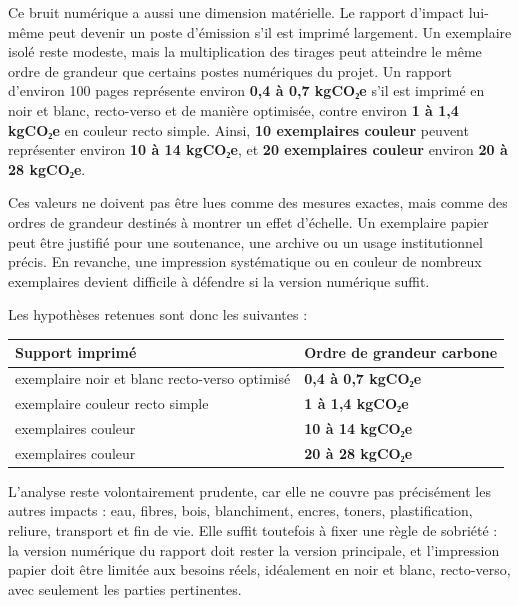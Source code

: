 \documentclass[
  10pt,
  a4paper,
  DIV=11,
  numbers=noendperiod,
  oneside]{scrreprt}
\newcounter{none} %
\let\oldtextbf\textbf
\renewcommand{\textbf}[1]{\oldtextbf{\textcolor{cmmnavy}{#1}}}
\begin{document}
Ce bruit numérique a aussi une dimension matérielle. Le rapport d'impact
lui-même peut devenir un poste d'émission s'il est imprimé largement. Un
exemplaire isolé reste modeste, mais la multiplication des tirages peut
atteindre le même ordre de grandeur que certains postes numériques du
projet. Un rapport d'environ 100 pages représente environ \textbf{0,4 à
0,7 kgCO₂e} s'il est imprimé en noir et blanc, recto-verso et de manière
optimisée, contre environ \textbf{1 à 1,4 kgCO₂e} en couleur recto
simple. Ainsi, \textbf{10 exemplaires couleur} peuvent représenter
environ \textbf{10 à 14 kgCO₂e}, et \textbf{20 exemplaires couleur}
environ \textbf{20 à 28 kgCO₂e}.

Ces valeurs ne doivent pas être lues comme des mesures exactes, mais
comme des ordres de grandeur destinés à montrer un effet d'échelle. Un
exemplaire papier peut être justifié pour une soutenance, une archive ou
un usage institutionnel précis. En revanche, une impression systématique
ou en couleur de nombreux exemplaires devient difficile à défendre si la
version numérique suffit.

Les hypothèses retenues sont donc les suivantes :

{\def\LTcaptype{none} %
\begin{longtable}[]{@{}
  >{\raggedright\arraybackslash}p{}
  >{\raggedleft\arraybackslash}p{}@{}}
\toprule\noalign{}
\begin{minipage}[b]{\linewidth}\raggedright
Support imprimé
\end{minipage} & \begin{minipage}[b]{\linewidth}\raggedleft
Ordre de grandeur carbone
\end{minipage} \\
\midrule\noalign{}
\endhead
\bottomrule\noalign{}
\endlastfoot
1 exemplaire noir et blanc recto-verso optimisé & \textbf{0,4 à 0,7
kgCO₂e} \\
1 exemplaire couleur recto simple & \textbf{1 à 1,4 kgCO₂e} \\
10 exemplaires couleur & \textbf{10 à 14 kgCO₂e} \\
20 exemplaires couleur & \textbf{20 à 28 kgCO₂e} \\
\end{longtable}
}

L'analyse reste volontairement prudente, car elle ne couvre pas
précisément les autres impacts : eau, fibres, bois, blanchiment, encres,
toners, plastification, reliure, transport et fin de vie. Elle suffit
toutefois à fixer une règle de sobriété : la version numérique du
rapport doit rester la version principale, et l'impression papier doit
être limitée aux besoins réels, idéalement en noir et blanc,
recto-verso, avec seulement les parties pertinentes.
\end{document}
